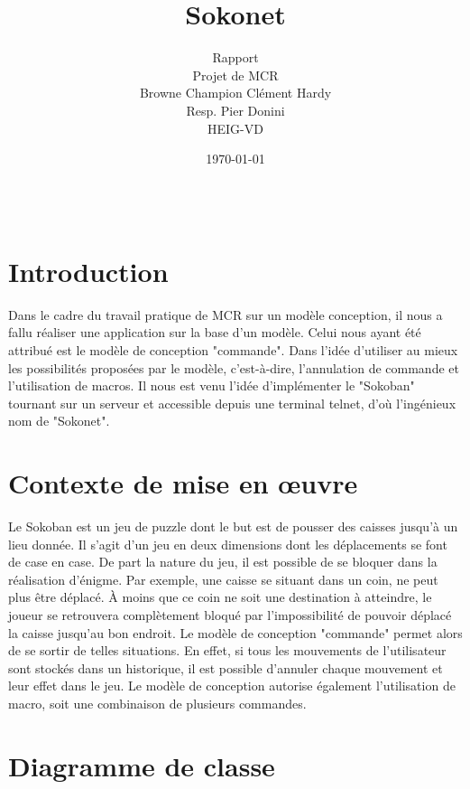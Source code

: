 \documentclass[french]{article}
\begin{document}
	
	\title{Sokonet}
	\author{Rapport\\ 
		Projet de MCR\\
		Browne Champion Clément Hardy\\
		Resp. Pier Donini\\
		HEIG-VD}
	\date{\today} %
	\maketitle
	\thispagestyle{empty}
	
	\newpage
	\thispagestyle{empty}
	$ $
	\newpage
	
	\justify
	\normalsize
	
	\tableofcontents
	\newpage
	
	\section{Introduction}
		Dans le cadre du travail pratique de MCR sur un modèle conception, il nous a fallu réaliser une application sur la base d'un modèle. Celui nous ayant été attribué est le modèle de conception "commande". Dans l'idée d'utiliser au mieux les possibilités proposées par le modèle, c'est-à-dire, l'annulation de commande et l'utilisation de macros. Il nous est venu l'idée d'implémenter le "Sokoban" tournant sur un serveur et accessible depuis une terminal telnet, d'où l'ingénieux nom de "Sokonet".
	\section{Contexte de mise en œuvre}
		Le Sokoban est un jeu de puzzle dont le but est de pousser des caisses jusqu'à un lieu donnée. Il s'agit d'un jeu en deux dimensions dont les déplacements se font de case en case. De part la nature du jeu, il est possible de se bloquer dans la réalisation d'énigme. Par exemple, une caisse se situant dans un coin, ne peut plus être déplacé. À moins que ce coin ne soit une destination à atteindre, le joueur se retrouvera complètement bloqué par l'impossibilité de pouvoir déplacé la caisse jusqu'au bon endroit. Le modèle de conception "commande" permet alors de se sortir de telles situations. En effet, si tous les mouvements de l'utilisateur sont stockés dans un historique, il est possible d'annuler chaque mouvement et leur effet dans le jeu. Le modèle de conception autorise également l'utilisation de macro, soit une combinaison de plusieurs commandes.
	\section{Diagramme de classe}
\end{document}
